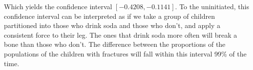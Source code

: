 \documentclass[10pt]{article}\usepackage[]{graphicx}\usepackage[]{xcolor}
\begin{document}
\begin{easylist}[enumerate]
    Which yields the confidence interval $\left[ -0.4208, -0.1141 \right]$. To the uninitiated, this
    confidence interval can be interpreted as if we take a group of children partitioned into those who drink soda and
    those who don't, and apply a consistent force to their leg. The ones that drink soda more often will break a bone
    than those who don't. The difference between the proportions of the populations of the children with fractures will
    fall within this interval 99\% of the time.
\end{easylist}

\newpage
\end{document}
